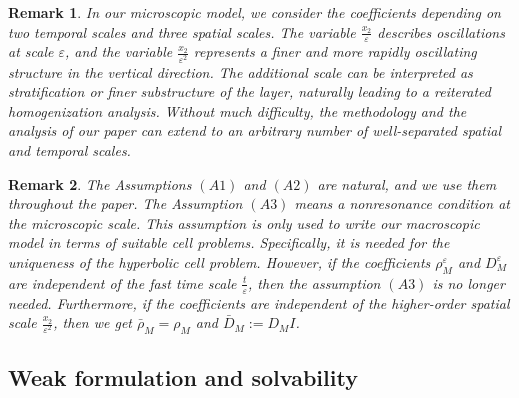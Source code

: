\documentclass[11pt]{article}
\newtheorem{remark}{Remark}
\def\es{\varepsilon}
\def\p{\partial}
\def\pt{\partial\tau}
\def\T{\mathcal{T}}
\newcommand{\di}[1]{\,\mathrm{d}#1}
\newcommand{\V}{\textcolor{blue}}
\begin{document}
\begin{itemize}
            
            
\end{itemize}


\begin{remark}
In our microscopic model, we consider the coefficients depending on two temporal scales and three spatial scales. The variable $\frac{x_2}{\es}$ describes oscillations at scale $\es$, and the variable $\frac{x_2}{\es^2}$ represents a finer and more rapidly oscillating structure in the vertical direction. The additional scale can be interpreted as stratification or finer substructure of the layer, naturally leading to a reiterated homogenization analysis. Without much difficulty, the methodology and the analysis of our paper can extend to an arbitrary number of well-separated spatial and temporal scales.
\end{remark}
\begin{remark}
    The Assumptions $(A1)$ and $(A2)$ are natural, and we use them throughout the paper. The Assumption $(A3)$ means a nonresonance condition at the microscopic scale. This assumption is only  used to write our macroscopic model in terms of suitable cell problems. Specifically, it is needed for the uniqueness of the hyperbolic cell problem. However, if the coefficients $\rho_M^\es$ and $D_M^\es$ are independent of the fast time scale $\frac{t}{\es}$, then  the assumption $(A3)$ is no longer needed. Furthermore, if the coefficients are independent of the higher-order spatial scale $\frac{x_2}{\es^2}$, then we get $\bar\rho_M=\rho_M$ and $\bar D_M:=D_MI$.
\end{remark}
\subsection{Weak formulation and solvability}
\end{document}
